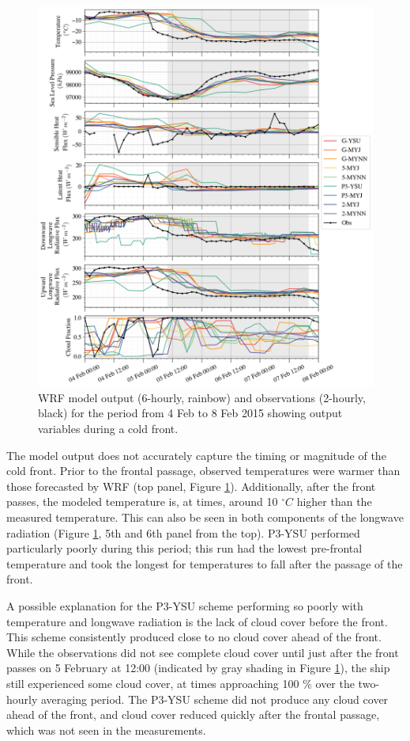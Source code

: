 \begin{figure}[p]
    \centering
    \includegraphics[width=1\linewidth]{figures/chapter3/wrf_case1.png}
    \caption[Polar WRF Case 1 - Winter cold front (5 Feb 2015) timeseries]{WRF model output (6-hourly, rainbow) and observations (2-hourly, black) for the period from 4 Feb to 8 Feb 2015 showing output variables during a cold front.}
    \label{fig:wrf_case1}
\end{figure}

The model output does not accurately capture the timing or magnitude of the cold front. Prior to the frontal passage, observed temperatures were warmer than those forecasted by WRF (top panel, Figure \ref{fig:wrf_case1}). Additionally, after the front passes, the modeled temperature is, at times, around 10 $^{\circ} C$ higher than the measured temperature. This can also be seen in both components of the longwave radiation (Figure \ref{fig:wrf_case1}, 5th and 6th panel from the top). P3-YSU performed particularly poorly during this period; this run had the lowest pre-frontal temperature and took the longest for temperatures to fall after the passage of the front.

A possible explanation for the P3-YSU scheme performing so poorly with temperature and longwave radiation is the lack of cloud cover before the front. This scheme consistently produced close to no cloud cover ahead of the front. While the observations did not see complete cloud cover until just after the front passes on 5 February at 12:00 (indicated by gray shading in Figure \ref{fig:wrf_case1}), the ship still experienced some cloud cover, at times approaching 100 $\%$ over the two-hourly averaging period. The P3-YSU scheme did not produce any cloud cover ahead of the front, and cloud cover reduced quickly after the frontal passage, which was not seen in the measurements. 

